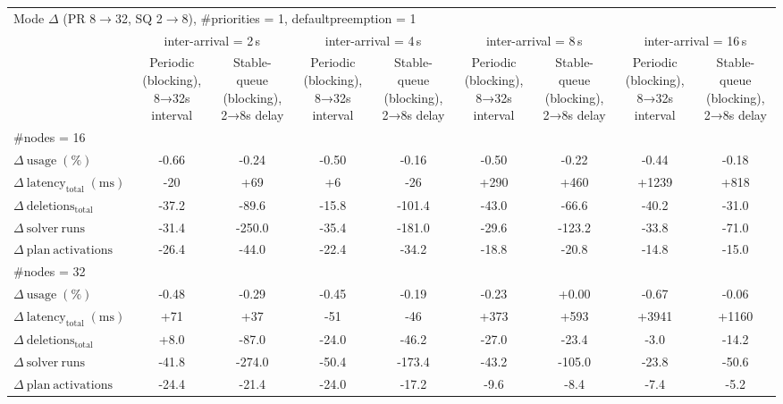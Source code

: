 
\begin{tabular}{l c c c c c c c c}
\toprule
\multicolumn{9}{l}{Mode $\Delta$ (PR 8$\rightarrow$32, SQ 2$\rightarrow$8), \#priorities = 1, defaultpreemption = 1} \\
\addlinespace[0.2em]
 & \multicolumn{2}{c}{inter-arrival = 2\,s} & \multicolumn{2}{c}{inter-arrival = 4\,s} & \multicolumn{2}{c}{inter-arrival = 8\,s} & \multicolumn{2}{c}{inter-arrival = 16\,s} \\
\cmidrule(lr){2-3}\cmidrule(lr){4-5}\cmidrule(lr){6-7}\cmidrule(lr){8-9}
 & Periodic (blocking), 8→32s interval & Stable-queue (blocking), 2→8s delay & Periodic (blocking), 8→32s interval & Stable-queue (blocking), 2→8s delay & Periodic (blocking), 8→32s interval & Stable-queue (blocking), 2→8s delay & Periodic (blocking), 8→32s interval & Stable-queue (blocking), 2→8s delay \\
\midrule
\multicolumn{9}{l}{\#nodes = 16} \\
\midrule
$\Delta\ \mathrm{usage}\;(\%)$ & -0.66 & -0.24 & -0.50 & -0.16 & -0.50 & -0.22 & -0.44 & -0.18 \\
$\Delta\ \mathrm{latency}_{\mathrm{total}}\;(\mathrm{ms})$ & -20 & +69 & +6 & -26 & +290 & +460 & +1239 & +818 \\
$\Delta\ \mathrm{deletions}_{\mathrm{total}}$ & -37.2 & -89.6 & -15.8 & -101.4 & -43.0 & -66.6 & -40.2 & -31.0 \\
$\Delta\ \mathrm{solver\ runs}$ & -31.4 & -250.0 & -35.4 & -181.0 & -29.6 & -123.2 & -33.8 & -71.0 \\
$\Delta\ \mathrm{plan\ activations}$ & -26.4 & -44.0 & -22.4 & -34.2 & -18.8 & -20.8 & -14.8 & -15.0 \\
\midrule
\multicolumn{9}{l}{\#nodes = 32} \\
\midrule
$\Delta\ \mathrm{usage}\;(\%)$ & -0.48 & -0.29 & -0.45 & -0.19 & -0.23 & +0.00 & -0.67 & -0.06 \\
$\Delta\ \mathrm{latency}_{\mathrm{total}}\;(\mathrm{ms})$ & +71 & +37 & -51 & -46 & +373 & +593 & +3941 & +1160 \\
$\Delta\ \mathrm{deletions}_{\mathrm{total}}$ & +8.0 & -87.0 & -24.0 & -46.2 & -27.0 & -23.4 & -3.0 & -14.2 \\
$\Delta\ \mathrm{solver\ runs}$ & -41.8 & -274.0 & -50.4 & -173.4 & -43.2 & -105.0 & -23.8 & -50.6 \\
$\Delta\ \mathrm{plan\ activations}$ & -24.4 & -21.4 & -24.0 & -17.2 & -9.6 & -8.4 & -7.4 & -5.2 \\
\bottomrule
\end{tabular}


